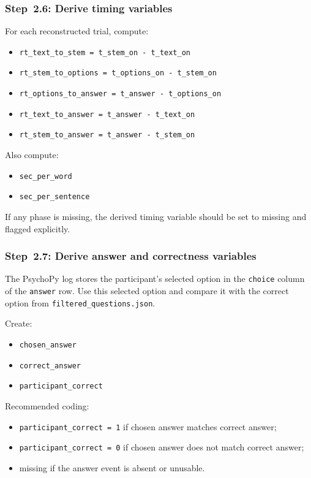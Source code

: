 \subsubsection{Step~2.6: Derive timing variables}
For each reconstructed trial, compute:
\begin{itemize}
    \item \texttt{rt\_text\_to\_stem = t\_stem\_on - t\_text\_on}
    \item \texttt{rt\_stem\_to\_options = t\_options\_on - t\_stem\_on}
    \item \texttt{rt\_options\_to\_answer = t\_answer - t\_options\_on}
    \item \texttt{rt\_text\_to\_answer = t\_answer - t\_text\_on}
    \item \texttt{rt\_stem\_to\_answer = t\_answer - t\_stem\_on}
\end{itemize}

Also compute:
\begin{itemize}
    \item \texttt{sec\_per\_word}
    \item \texttt{sec\_per\_sentence}
\end{itemize}

If any phase is missing, the derived timing variable should be set to missing and flagged explicitly.

\subsubsection{Step~2.7: Derive answer and correctness variables}
The PsychoPy log stores the participant's selected option in the \texttt{choice} column of the \texttt{answer} row.
Use this selected option and compare it with the correct option from \texttt{filtered\_questions.json}.

Create:
\begin{itemize}
    \item \texttt{chosen\_answer}
    \item \texttt{correct\_answer}
    \item \texttt{participant\_correct}
\end{itemize}

Recommended coding:
\begin{itemize}
    \item \texttt{participant\_correct = 1} if chosen answer matches correct answer;
    \item \texttt{participant\_correct = 0} if chosen answer does not match correct answer;
    \item missing if the answer event is absent or unusable.
\end{itemize}

